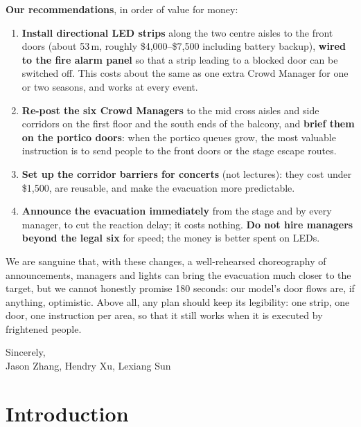 \documentclass{article}
\begin{document}
{\textbf{Our recommendations}, in order of value for money:
\begin{enumerate}
    \item \textbf{Install directional LED strips} along the two centre aisles to the front doors (about 53\,m, roughly \$4,000--\$7,500 including battery backup), \textbf{wired to the fire alarm panel} so that a strip leading to a blocked door can be switched off. This costs about the same as one extra Crowd Manager for one or two seasons, and works at every event.
    \item \textbf{Re-post the six Crowd Managers} to the mid cross aisles and side corridors on the first floor and the south ends of the balcony, and \textbf{brief them on the portico doors}: when the portico queues grow, the most valuable instruction is to send people to the front doors or the stage escape routes.
    \item \textbf{Set up the corridor barriers for concerts} (not lectures): they cost under \$1,500, are reusable, and make the evacuation more predictable.
    \item \textbf{Announce the evacuation immediately} from the stage and by every manager, to cut the reaction delay; it costs nothing. \textbf{Do not hire managers beyond the legal six} for speed; the money is better spent on LEDs.
\end{enumerate}

We are sanguine that, with these changes, a well-rehearsed choreography of announcements, managers and lights can bring the evacuation much closer to the target, but we cannot honestly promise 180 seconds: our model's door flows are, if anything, optimistic. Above all, any plan should keep its legibility: one strip, one door, one instruction per area, so that it still works when it is executed by frightened people.

\medskip
\noindent Sincerely,\\
Jason Zhang, Hendry Xu, Lexiang Sun
}

\newpage
\tableofcontents

\newpage
\section{Introduction}
\end{document}
